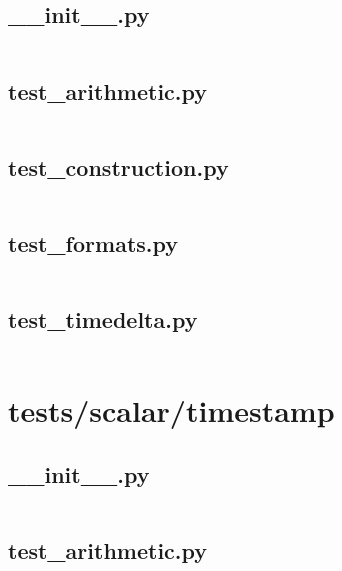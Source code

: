 \documentclass{article}
\begin{document}
\subsection{\_\_init\_\_.py}
\inputminted{python}{/home/dufferzafar/dev/@clones/pandas/pandas/tests/scalar/timedelta/__init__.py}
\newpage

\subsection{test\_arithmetic.py}
\inputminted{python}{/home/dufferzafar/dev/@clones/pandas/pandas/tests/scalar/timedelta/test_arithmetic.py}
\newpage

\subsection{test\_construction.py}
\inputminted{python}{/home/dufferzafar/dev/@clones/pandas/pandas/tests/scalar/timedelta/test_construction.py}
\newpage

\subsection{test\_formats.py}
\inputminted{python}{/home/dufferzafar/dev/@clones/pandas/pandas/tests/scalar/timedelta/test_formats.py}
\newpage

\subsection{test\_timedelta.py}
\inputminted{python}{/home/dufferzafar/dev/@clones/pandas/pandas/tests/scalar/timedelta/test_timedelta.py}
\newpage

\section{tests/scalar/timestamp}

\subsection{\_\_init\_\_.py}
\inputminted{python}{/home/dufferzafar/dev/@clones/pandas/pandas/tests/scalar/timestamp/__init__.py}
\newpage

\subsection{test\_arithmetic.py}
\inputminted{python}{/home/dufferzafar/dev/@clones/pandas/pandas/tests/scalar/timestamp/test_arithmetic.py}
\newpage
\end{document}
